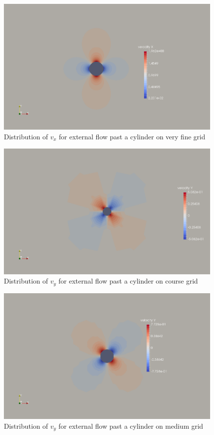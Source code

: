 \documentclass[12pt]{elsarticle}
\begin{document}
	\begin{figure}[h] \label{cyl__velx_vfin}
		\centering\includegraphics[width=1.0\linewidth]{velx_vfin}
		\caption{Distribution of $v_x$ for external flow past a cylinder on very fine grid}
	\end{figure}
	
	\begin{figure}[h] \label{cyl__vely_cou}
		\centering\includegraphics[width=1.0\linewidth]{vely_cou}
		\caption{Distribution of $v_y$ for external flow past a cylinder on course grid}
	\end{figure}
	
	\begin{figure}[h] \label{cyl__vely_med}
		\centering\includegraphics[width=1.0\linewidth]{vely_med}
		\caption{Distribution of $v_y$ for external flow past a cylinder on medium grid}
	\end{figure}
	
\end{document}
